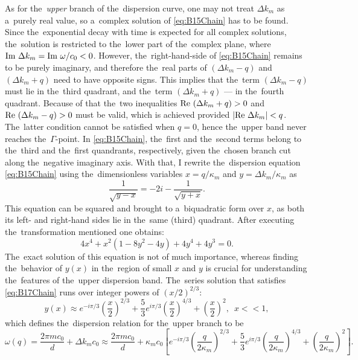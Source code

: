 As for the~{\it upper} branch of the~dispersion curve, one may not treat $\Delta k_m$ as a~purely real value, so a~complex solution of \cref{eq:B15Chain} has to be found.
Since the~exponential decay with time is expected for all complex solutions, the~solution is restricted to the~lower part of the~complex plane, where $\textrm{Im } \Delta k_m = \textrm{Im } \omega/c_0 <0$.
However, the~right-hand-side of \cref{eq:B15Chain} remains to be purely imaginary, and therefore the~real parts of $(\Delta k_m - q)$ and $(\Delta k_m + q)$ need to have opposite signs.
This implies that the~term $(\Delta k_m - q)$ must lie in the~third quadrant, and the~term $(\Delta k_m + q)$ --- in the~fourth quadrant.
Because of that the~two inequalities $\textrm{Re }(\Delta k_m +q)>0$ and $\textrm{Re }(\Delta k_m -q)>0$ must be valid, which is achieved provided $|\textrm{Re }\Delta k_m| < q$.
The~latter condition cannot be satisfied when $q=0$, hence the~upper band never reaches the~$\Gamma$-point.
In \cref{eq:B15Chain}, the~first and the~second terms belong to the~third and the~first quandrants, respectively, given the~chosen branch cut along the~negative imaginary axis.
With that, I rewrite the~dispersion equation \cref{eq:B15Chain} using the~dimensionless variables $x=q/\kappa_m$ and $y= \Delta k_m/\kappa_m$ as
\begin{equation}
\label{eq:B16Chain}
\frac{1}{\sqrt{y-x}} = - 2i - \frac{1}{\sqrt{y+x}}.
\end{equation}
This equation can be squared and brought to a~biquadratic form over $x$, as both its left- and right-hand sides lie in the~same (third) quadrant.
After executing the~transformation mentioned one obtains:
\begin{equation}
\label{eq:B17Chain}
4 x^4 + x^2(1-8y^2-4y) + 4y^4 +4 y^3 =0.
\end{equation}
The~exact solution of this equation is not of much importance, whereas finding the~behavior of $y(x)$ in the~region of small $x$ and $y$ is crucial for understanding the~features of the~upper dispersion band.
The~series solution that satisfies \cref{eq:B17Chain} runs over integer powers of $(x/2)^{2/3}$:
\begin{equation}
\label{eq:B19Chain}
 y(x) \approx e^{-i\pi/3}\left(\frac{x}{2}\right)^{2/3} + \frac53 e^{i\pi/3}\left(\frac{x}{2}\right)^{4/3} + \left(\frac{x}{2}\right)^2, \,\,\,x << 1,
\end{equation}
which defines the~dispersion relation for the~upper branch to be
\begin{equation}
\label{eq:BGChain}
\omega(q)=\frac{2 \pi m c_0}{d}+ \Delta k_m c_0 \approx \frac{2 \pi m c_0}{d} + \kappa_m c_0 \left[e^{-i\pi/3}\left(\frac{q}{2\kappa_m}\right)^{2/3} + \frac53 e^{i\pi/3}\left(\frac{q}{2\kappa_m}\right)^{4/3} + \left(\frac{q}{2\kappa_m}\right)^2\right].
\end{equation}

